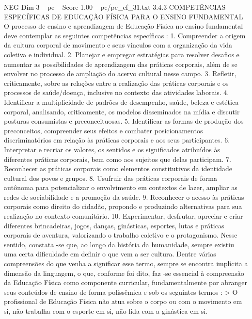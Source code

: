 \begin{textsample}{NEG Dim 3 – pe – Score 1.00 – pe/pe\_ef\_31.txt}  \label{ex:f3_neg_007}
3.4.3 COMPETÊNCIAS ESPECÍFICAS DE EDUCAÇÃO FÍSICA PARA O ENSINO FUNDAMENTAL O processo de ensino e aprendizagem de Educação Física no ensino fundamental deve contemplar as seguintes competências específicas : 1.
Compreender a origem da cultura corporal de movimento e seus vínculos com a organização da vida coletiva e individual. 2.
Planejar e empregar estratégias para resolver desafios e aumentar as possibilidades de aprendizagem das práticas corporais, além de se envolver no processo de ampliação do acervo cultural nesse campo. 3.
Refletir, criticamente, sobre as relações entre a realização das práticas corporais e os processos de saúde/doença, inclusive no contexto das atividades laborais. 4.
Identificar a multiplicidade de padrões de desempenho, saúde, beleza e estética corporal, analisando, criticamente, os modelos disseminados na mídia e discutir posturas consumistas e preconceituosas. 5.
Identificar as formas de produção dos preconceitos, compreender seus efeitos e combater posicionamentos discriminatórios em relação às práticas corporais e aos seus participantes. 6.
Interpretar e recriar os valores, os sentidos e os significados atribuídos às diferentes práticas corporais, bem como aos sujeitos que delas participam. 7.
Reconhecer as práticas corporais como elementos constitutivos da identidade cultural dos povos e grupos. 8.
Usufruir das práticas corporais de forma autônoma para potencializar o envolvimento em contextos de lazer, ampliar as redes de sociabilidade e a promoção da saúde. 9.
Reconhecer o acesso às práticas corporais como direito do cidadão, propondo e produzindo alternativas para sua realização no contexto comunitário. 10.
Experimentar, desfrutar, apreciar e criar diferentes brincadeiras, jogos, danças, ginásticas, esportes, lutas e práticas corporais de aventura, valorizando o trabalho coletivo e o protagonismo.
Nesse sentido, constata -se que, ao longo da história da humanidade, sempre existiu uma certa dificuldade em definir o que vem a ser cultura.
Dentre várias compreensões do que venha a significar esse termo, sempre se encontra implícita a dimensão da linguagem, o que, conforme foi dito, faz -se essencial à compreensão da Educação Física como componente curricular, fundamentalmente por abranger seus conteúdos de ensino de forma polissêmica e sob os seguintes termos : > O profissional de Educação Física não atua sobre o corpo ou com o movimento em si, não trabalha com o esporte em si, não lida com a ginástica em si.

\end{textsample}
